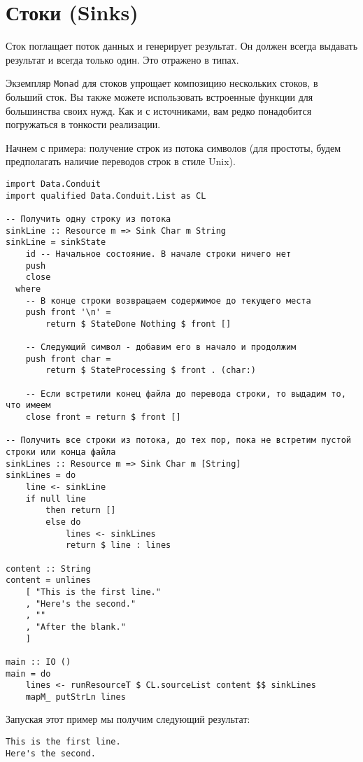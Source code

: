 {\section{Стоки (Sinks)}

Сток поглащает поток данных и генерирует результат. Он должен всегда выдавать результат
и всегда только один. Это отражено в типах.

Экземпляр \lstinline=Monad= для стоков упрощает композицию нескольких стоков, в больший
сток. Вы также
можете использовать встроенные функции для большинства своих нужд. Как и с источниками,
вам редко понадобится погружаться в тонкости реализации. 

Начнем с примера:
получение строк из потока символов (для простоты, будем предполагать наличие переводов
строк в стиле Unix).

\begin{lstlisting}
import Data.Conduit
import qualified Data.Conduit.List as CL

-- Получить одну строку из потока
sinkLine :: Resource m => Sink Char m String
sinkLine = sinkState
    id -- Начальное состояние. В начале строки ничего нет
    push
    close
  where
    -- В конце строки возвращаем содержимое до текущего места
    push front '\n' =
        return $ StateDone Nothing $ front []

    -- Следующий символ - добавим его в начало и продолжим
    push front char =
        return $ StateProcessing $ front . (char:)

    -- Если встретили конец файла до перевода строки, то выдадим то, что имеем
    close front = return $ front []

-- Получить все строки из потока, до тех пор, пока не встретим пустой строки или конца файла
sinkLines :: Resource m => Sink Char m [String]
sinkLines = do
    line <- sinkLine
    if null line
        then return []
        else do
            lines <- sinkLines
            return $ line : lines

content :: String
content = unlines
    [ "This is the first line."
    , "Here's the second."
    , ""
    , "After the blank."
    ]

main :: IO ()
main = do
    lines <- runResourceT $ CL.sourceList content $$ sinkLines
    mapM_ putStrLn lines
\end{lstlisting}
Запуская этот пример мы получим следующий результат:
\begin{verbatim}
This is the first line.
Here's the second.
\end{verbatim}

}
